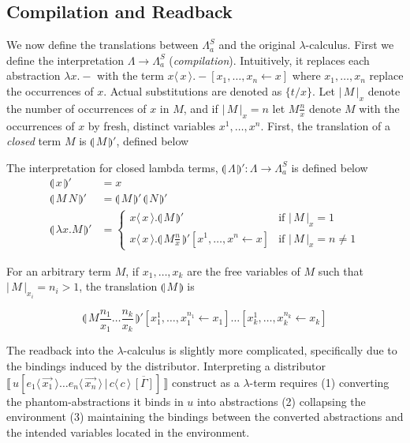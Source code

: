 \documentclass[a4paper,UKenglish,cleveref, autoref]{lipics-v2019}
\newcommand{\FALC}{\Lambda^{S}_{a}}
\newcommand{\abs}[2]{\lambda #1 . #2}
\newcommand{\app}[2]{#1 \, #2}
\newcommand{\fake}[3]{#1 \langle \, #2 \, \rangle . #3}
\newcommand{\share}[3]{#1 [#2 \leftarrow #3]}
\newcommand{\dist}[5]{#1 [ #2 \, \vert \, \fakedist{#4}{#5} \, #3 ]}
\newcommand{\fakedist}[2]{#1 \langle \, #2 \, \rangle}
\newcommand{\size}[1]{\vert \, #1 \, \vert}
\newcommand{\sub}[3]{#1 \{ #2 / #3 \}}
\newcommand{\compile}[1]{\llparenthesis \, #1 \, \rrparenthesis}
\newcommand{\trans}[1]{\llbracket \, #1 \, \rrbracket}
\begin{document}
\subsection{Compilation and Readback}

We now define the translations between $\FALC$ and the original $\lambda$-calculus. First we define the interpretation $\Lambda \rightarrow \FALC$ (\emph{compilation}). Intuitively, it replaces each abstraction $\lambda x . -$ with the term $\fake{x}{x}{\share{-}{x_{1}, \dots, x_{n}}{x}}$ where $x_{1}, \dots, x_{n}$ replace the occurrences of $x$. Actual substitutions are denoted as $\sub{}{t}{x}$. Let $\size{M}_{x}$ denote the number of occurrences of $x$ in $M$, and if $\size{M}_{x} = n$ let $M \frac{n}{x}$ denote $M$ with the occurrences of $x$ by fresh, distinct variables $x^{1}, \dots, x^{n}$. First, the translation of a \emph{closed} term $M$ is $\compile{M}'$, defined below

\begin{definition}[Compilation]
\label{def:compile}
The interpretation for closed lambda terms, $\compile{\Lambda}' : \Lambda \rightarrow \FALC$ is defined below
\begin{align*}
	\compile{x}' &= x \\
	\compile{\app{M}{N}}' &= \app{\compile{M}'}{\compile{N}'} \\
	\compile{\abs{x}{M}}' &= 
	\begin{cases}
		\fake{x}{x}{\compile{M}'} & \text{if } \size{M}_{x} = 1 \\
		\fake{x}{x}{\share{\compile{M \frac{n}{x}}'}{x^{1}, \dots, x^{n}}{x}} & \text{if } \size{M}_{x} = n \neq 1
	\end{cases}
\end{align*}
\end{definition}

\noindent For an arbitrary term $M$, if $x_{1}, \dots, x_{k}$ are the free variables of $M$ such that $\size{M}_{x_{i}} = n_{i} > 1$, the translation $\compile{M}$ is

$$\compile{M \frac{n_{1}}{x_{1}} \dots \frac{n_{k}}{x_{k}} }' \share{}{x^{1}_{1}, \dots, x^{n_{1}}_{1}}{x_{1}} \dots \share{}{x^{1}_{k}, \dots, x^{n_{k}}_{k}}{x_{k}}$$

The readback into the $\lambda$-calculus is slightly more complicated, specifically due to the bindings induced by the distributor. Interpreting a distributor $\trans{\dist{u}{\fakedist{e_{1}}{\vec{x_{1}}} \dots \fakedist{e_{n}}{\vec{x_{n}}}}{\overline{[\Gamma]}}{c}{c}}$ construct as a $\lambda$-term requires (1) converting the phantom-abstractions it binds in $u$ into abstractions (2) collapsing the environment (3) maintaining the bindings between the converted abstractions and the intended variables located in the environment. 
\end{document}
